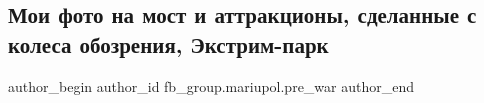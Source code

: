  
 
 
 
 

\subsection{Мои фото на мост и аттракционы, сделанные с колеса обозрения, Экстрим-парк}
\label{sec:23_01_2023.fb.fb_group.mariupol.pre_war.4.moi_foto_na_most_i_a}

\ifcmt
 author_begin
   author_id fb_group.mariupol.pre_war
 author_end
\fi
